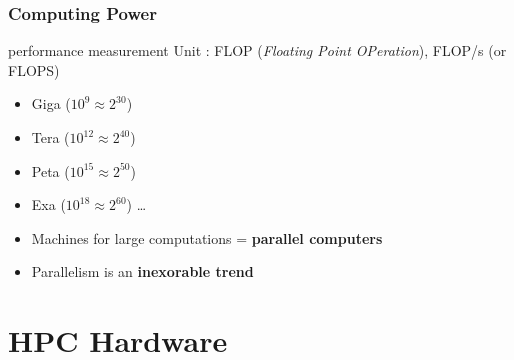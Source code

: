 \documentclass[xcolor={x11names,svgnames,psnames}]{beamer}
\newcommand{\red}{\alert}
\begin{document}

\begin{frame}
  \frametitle{Computing Power}

  \begin{block}{performance measurement}
  Unit : FLOP (\textit{Floating Point OPeration}), FLOP/s (or FLOPS)

  \begin{itemize}
  \item Giga ($10^9 \approx 2^{30}$)
  \item Tera ($10^{12} \approx 2^{40}$)
  \item Peta ($10^{15} \approx 2^{50}$)
  \item Exa  ($10^{18} \approx 2^{60}$) \dots 
  \end{itemize}
\end{block}

\bigskip

\begin{itemize}
\item Machines for large computations = \textbf{\red{parallel} computers}

  \medskip

  \item Parallelism is an \textbf{inexorable trend}
  \end{itemize}
\end{frame}


\section{HPC Hardware}
\end{document}
